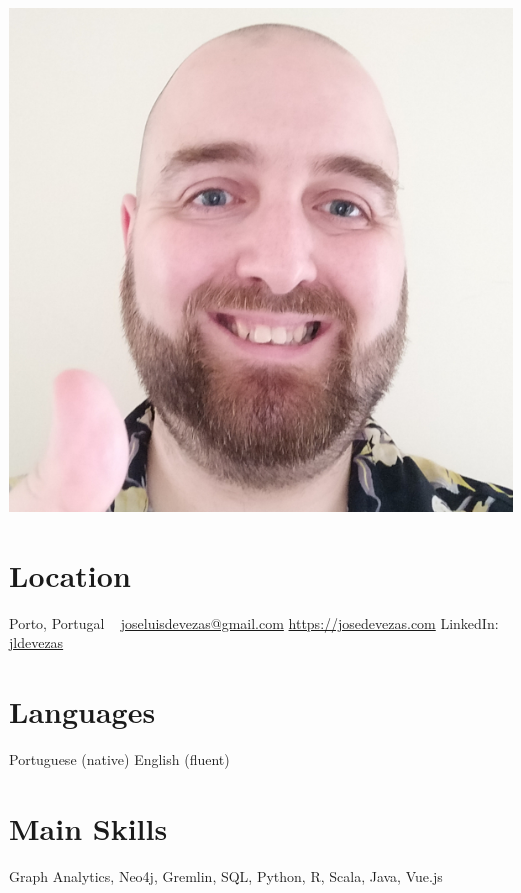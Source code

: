 \documentclass{friggeri-cv}
\begin{document}


\begin{aside} %
\includegraphics[width=\textwidth]{photo.jpg}
%
\section{Location}
Porto, Portugal
~
{\footnotesize \href{mailto:joseluisdevezas@gmail.com}{joseluisdevezas@gmail.com}
\href{https://josedevezas.com}{https://josedevezas.com}
LinkedIn: \href{https://www.linkedin.com/in/jldevezas/?locale=en_US}{jldevezas}}
%
\section{Languages}
Portuguese (native)
English (fluent)
%
\section{Main Skills}
{\small Graph Analytics, Neo4j, Gremlin, SQL, Python, R, Scala, Java, Vue.js}
\end{aside}
\end{document}
